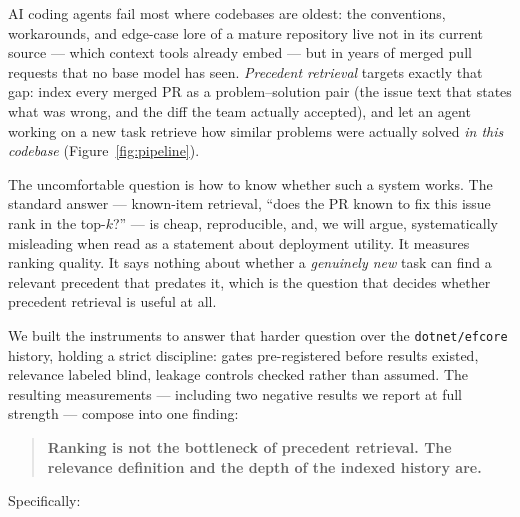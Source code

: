 \documentclass[sigconf,nonacm]{acmart}
\begin{document}
AI coding agents fail most where codebases are oldest: the conventions,
workarounds, and edge-case lore of a mature repository live not in its
current source --- which context tools already embed --- but in years of
merged pull requests that no base model has seen. \emph{Precedent
retrieval} targets exactly that gap: index every merged PR as a
problem--solution pair (the issue text that states what was wrong, and the
diff the team actually accepted), and let an agent working on a new task
retrieve how similar problems were actually solved \emph{in this codebase}
(Figure~\ref{fig:pipeline}).

The uncomfortable question is how to know whether such a system works.
The standard answer --- known-item retrieval, ``does the PR known to fix
this issue rank in the top-$k$?'' --- is cheap, reproducible, and, we will
argue, systematically misleading when read as a statement about deployment
utility. It measures ranking quality. It says nothing about whether a
\emph{genuinely new} task can find a relevant precedent that predates it,
which is the question that decides whether precedent retrieval is useful
at all.

We built the instruments to answer that harder question over the
\texttt{dotnet/efcore} history, holding a strict discipline: gates
pre-registered before results existed, relevance labeled blind, leakage
controls checked rather than assumed. The resulting measurements ---
including two negative results we report at full strength --- compose into
one finding:

\begin{quote}
\textbf{Ranking is not the bottleneck of precedent retrieval. The
relevance definition and the depth of the indexed history are.}
\end{quote}

Specifically:
\end{document}
